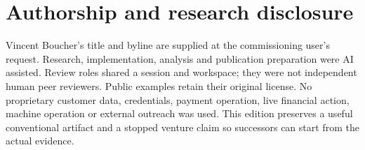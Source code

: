 \documentclass[11pt,letterpaper]{article}
\begin{document}
\hypertarget{authorship-and-research-disclosure}{%
\section{Authorship and research disclosure}\label{authorship-and-research-disclosure}}

Vincent Boucher's title and byline are supplied at the commissioning user's request. Research, implementation, analysis and publication preparation were AI assisted. Review roles shared a session and workspace; they were not independent human peer reviewers. Public examples retain their original license. No proprietary customer data, credentials, payment operation, live financial action, machine operation or external outreach was used. This edition preserves a useful conventional artifact and a stopped venture claim so successors can start from the actual evidence.
\end{document}

